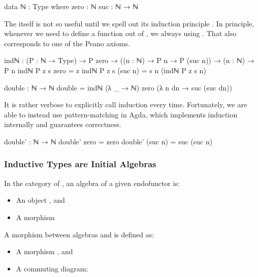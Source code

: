 \begin{code}
data ℕ : Type where
  zero : ℕ
  suc : ℕ → ℕ
\end{code}

 The  itself is not so useful until we spell out its induction principle . In principle, whenever we need to define a function out of , we always using . That also corresponds to one of the Peano axioms.

\begin{code}
indℕ : (P : ℕ → Type)
  → P zero
  → ((n : ℕ) → P n → P (suc n))
  → (n : ℕ) → P n
indℕ P z s zero = z
indℕ P z s (suc n) = s n (indℕ P z s n)

double : ℕ → ℕ
double = indℕ (λ _ → ℕ) zero (λ n dn → suc (suc dn))
\end{code}

It is rather verbose to explicitly call induction every time. Fortunately, we are able to instead use pattern-matching in Agda, which implements induction internally and guarantees correctness.

\begin{code}
double' : ℕ → ℕ
double' zero = zero
double' (suc n) = suc (suc n)
\end{code}

\subsubsection*{Inductive Types are Initial Algebras}

In the category of , an algebra  of a given endofunctor  \AgdaSymbol{:}    is:
\begin{itemize}
  \item{An object  \AgdaSymbol{:} }, and
  \item{A morphism  \AgdaSymbol{:}    }
\end{itemize}

A morphism between algebras \AgdaSymbol{(} \AgdaInductiveConstructor{,} \AgdaSymbol{)} and \AgdaSymbol{(} \AgdaInductiveConstructor{,} \AgdaSymbol{)} is defined as:
\begin{itemize}
  \item{A morphism  \AgdaSymbol{:}   }, and
  \item{A commuting diagram:}
\end{itemize}

